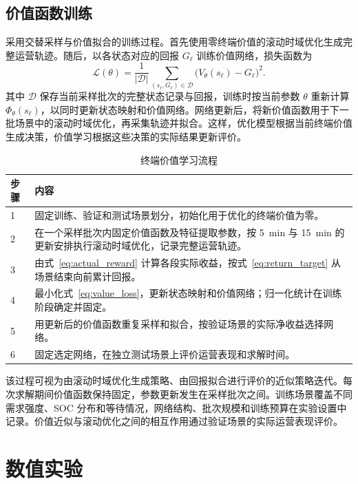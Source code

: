 \documentclass[12pt,a4paper,UTF8]{ctexart}
\numberwithin{equation}{section}
\begin{document}
\subsection{价值函数训练}
\label{sec:training}
采用交替采样与价值拟合的训练过程。首先使用零终端价值的滚动时域优化生成完整运营轨迹。随后，以各状态对应的回报 $G_\ell$ 训练价值网络，损失函数为
\begin{equation}
\mathcal L(\theta)=\frac{1}{|\mathcal D|}
\sum_{(s_\ell,G_\ell)\in\mathcal D}
\bigl(V_\theta(s_\ell)-G_\ell\bigr)^2.
\label{eq:value_loss}
\end{equation}
其中 $\mathcal D$ 保存当前采样批次的完整状态记录与回报，训练时按当前参数 $\theta$ 重新计算 $\Phi_\theta(s_\ell)$，以同时更新状态映射和价值网络。网络更新后，将新价值函数用于下一批场景中的滚动时域优化，再采集轨迹并拟合。这样，优化模型根据当前终端价值生成决策，价值学习根据这些决策的实际结果更新评价。

\begin{table}[!htbp]
\centering
\caption{终端价值学习流程}
\label{tab:training_algorithm}
\begin{tabularx}{\linewidth}{@{}lX@{}}
\toprule 步骤 & 内容 \\ \midrule
1 & 固定训练、验证和测试场景划分，初始化用于优化的终端价值为零。\\
2 & 在一个采样批次内固定价值函数及特征提取参数，按 5~min 与 15~min 的更新安排执行滚动时域优化，记录完整运营轨迹。\\
3 & 由式~\eqref{eq:actual_reward} 计算各段实际收益，按式~\eqref{eq:return_target} 从场景结束向前累计回报。\\
4 & 最小化式~\eqref{eq:value_loss}，更新状态映射和价值网络；归一化统计在训练阶段确定并固定。\\
5 & 用更新后的价值函数重复采样和拟合，按验证场景的实际净收益选择网络。\\
6 & 固定选定网络，在独立测试场景上评价运营表现和求解时间。\\
\bottomrule
\end{tabularx}
\end{table}

该过程可视为由滚动时域优化生成策略、由回报拟合进行评价的近似策略迭代。每次求解期间价值函数保持固定，参数更新发生在采样批次之间。训练场景覆盖不同需求强度、SOC 分布和等待情况，网络结构、批次规模和训练预算在实验设置中记录。价值近似与滚动优化之间的相互作用通过验证场景的实际运营表现评价。

\section{数值实验}
\label{exp:section}
\end{document}
